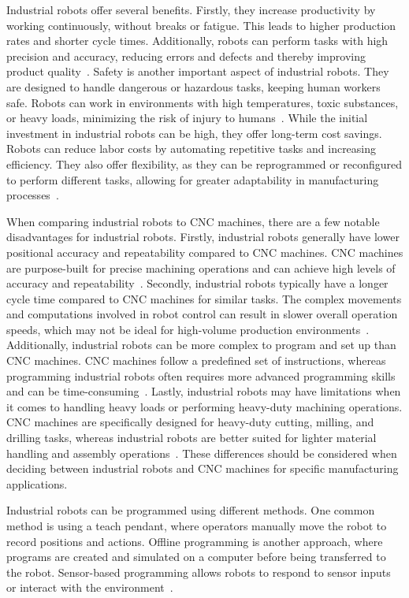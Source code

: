 Industrial robots offer several benefits. Firstly, they increase productivity by working continuously, without breaks or fatigue. This leads to higher production rates and shorter cycle times. Additionally, robots can perform tasks with high precision and accuracy, reducing errors and defects and thereby improving product quality~\cite{Kubela.2016}. Safety is another important aspect of industrial robots. They are designed to handle dangerous or hazardous tasks, keeping human workers safe. Robots can work in environments with high temperatures, toxic substances, or heavy loads, minimizing the risk of injury to humans~\cite{Heyer.2010}.
While the initial investment in industrial robots can be high, they offer long-term cost savings. Robots can reduce labor costs by automating repetitive tasks and increasing efficiency. They also offer flexibility, as they can be reprogrammed or reconfigured to perform different tasks, allowing for greater adaptability in manufacturing processes~\cite{Jung.2020b}.

When comparing industrial robots to \acrshort{CNC} machines, there are a few notable disadvantages for industrial robots. Firstly, industrial robots generally have lower positional accuracy and repeatability compared to \acrshort{CNC} machines. \acrshort{CNC} machines are purpose-built for precise machining operations and can achieve high levels of accuracy and repeatability~\cite{Wang.2023}.
Secondly, industrial robots typically have a longer cycle time compared to \acrshort{CNC} machines for similar tasks. The complex movements and computations involved in robot control can result in slower overall operation speeds, which may not be ideal for high-volume production environments~\cite{Joshi.2021}.
Additionally, industrial robots can be more complex to program and set up than \acrshort{CNC} machines. \acrshort{CNC} machines follow a predefined set of instructions, whereas programming industrial robots often requires more advanced programming skills and can be time-consuming~\cite{Ye.2022}. Lastly, industrial robots may have limitations when it comes to handling heavy loads or performing heavy-duty machining operations. \acrshort{CNC} machines are specifically designed for heavy-duty cutting, milling, and drilling tasks, whereas industrial robots are better suited for lighter material handling and assembly operations~\cite{Wu.2022}. These differences should be considered when deciding between industrial robots and \acrshort{CNC} machines for specific manufacturing applications.

Industrial robots can be programmed using different methods. One common method is using a teach pendant, where operators manually move the robot to record positions and actions. Offline programming is another approach, where programs are created and simulated on a computer before being transferred to the robot. Sensor-based programming allows robots to respond to sensor inputs or interact with the environment~\cite{Heimann.2020}. %


